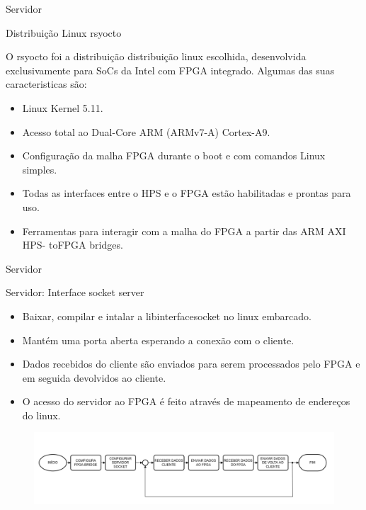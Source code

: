 \documentclass[10pt]{beamer}
\begin{document}
\begin{frame}{Servidor}
	\begin{alertblock}{Distribuição Linux rsyocto}
		\vspace{0.1cm}
		\begin{justify}
			O rsyocto foi a distribuição distribuição linux escolhida, desenvolvida exclusivamente para SoCs da Intel com FPGA integrado. Algumas das suas caracteristicas são:
		\end{justify}
		\begin{itemize}
			\item Linux Kernel 5.11.
			\item Acesso total ao Dual-Core ARM (ARMv7-A) Cortex-A9.
			\item Configuração da malha FPGA durante o boot e com comandos Linux simples.
			\item Todas as interfaces entre o HPS e o FPGA estão habilitadas e prontas para uso.
			\item Ferramentas para interagir com a malha do FPGA a partir das ARM AXI HPS-
			toFPGA bridges.
		\end{itemize}
	\end{alertblock}
\end{frame}

\begin{frame}{Servidor}
    \begin{alertblock}{Servidor: Interface socket server}
		\vspace{0.3cm}
		\begin{itemize}
			\item Baixar, compilar e intalar a libinterfacesocket no linux embarcado.
			\item Mantém uma porta aberta esperando a conexão com o cliente.
			\item Dados recebidos do cliente são enviados para serem processados pelo FPGA e em seguida devolvidos ao cliente.
			\item O acesso do servidor ao FPGA é feito através de mapeamento de endereços do
			linux.
		\end{itemize}
		\begin{figure}[h]
			\begin{center}
				\includegraphics[scale=0.28]{imagens/fluxogramaServidor.png}\\
			\end{center}
			\label{fig:servidor}
		\end{figure}
	\end{alertblock}
\end{frame}
\end{document}
